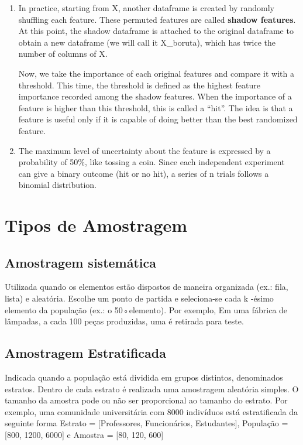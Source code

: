 \begin{enumerate}
\item In practice, starting from X, another dataframe is created by randomly shuffling each feature. These permuted features are called \textbf{shadow features}. At this point, the shadow dataframe is attached to the original dataframe to obtain a new dataframe (we will call it X\_boruta), which has twice the number of columns of X.

Now, we take the importance of each original features and compare it with a threshold. This time, the threshold is defined as the highest feature importance recorded among the shadow features. When the importance of a feature is higher than this threshold, this is called a “hit”. The idea is that a feature is useful only if it is capable of doing better than the best randomized feature.

\item The maximum level of uncertainty about the feature is expressed by a probability of 50\%, like tossing a coin. Since each independent experiment can give a binary outcome (hit or no hit), a series of n trials follows a binomial distribution.
\end{enumerate}

\section{Tipos de Amostragem}

\subsection{Amostragem sistemática}
Utilizada quando os elementos estão dispostos de maneira organizada (ex.: fila, lista) e aleatória. Escolhe um ponto de partida e seleciona-se cada k -ésimo elemento da população (ex.: o 50◦elemento). Por exemplo, Em uma fábrica de lâmpadas, a cada 100 peças produzidas, uma é retirada para teste.

\subsection{Amostragem Estratificada}
Indicada quando a população está dividida em grupos distintos, denominados estratos. Dentro de cada estrato é realizada uma amostragem aleatória simples. O tamanho da amostra pode ou não ser proporcional ao tamanho do estrato. Por exemplo, uma comunidade universitária com 8000 indivíduos está estratificada da seguinte forma Estrato = [Professores, Funcionários, Estudantes], População = [800, 1200, 6000] e Amostra = [80, 120, 600]
    
